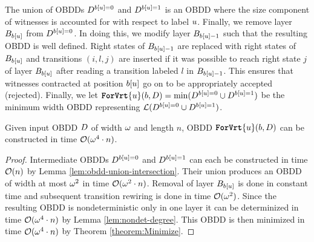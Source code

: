The union of OBDDs $D^{b[u]=0}$ and $D^{b[u]=1}$ is an OBDD where the size component of witnesses is accounted for with respect to label $u$. Finally, we remove layer $B_{b[u]}$ from $D^{b[u]=0}$. In doing this, we modify layer $B_{b[u]-1}$ such that the resulting OBDD is well defined. Right states of $B_{b[u]-1}$ are replaced with right states of $B_{b[u]}$ and transitions $(i,l,j)$ are inserted if it was possible to reach right state $j$ of layer $B_{b[u]}$ after reading a transition labeled $l$ in $B_{b[u]-1}$. This ensures that witnesses contracted at position $b[u]$ go on to be appropriately accepted (rejected). 
Finally, we let $\texttt{\textbf{ForVrt}}\{u\}(b, D) = \mathrm{min}(D^{b[u]=0}\cup D^{b[u]=1})$ be the minimum width OBDD representing $\mathcal{L}(D^{b[u]=0}\cup D^{b[u]=1})$.

\begin{proposition}\label{forgettime}
    Given input OBDD $D$ of width $\omega$ and length $n$, OBDD $\texttt{\textbf{ForVrt}}\{u\}(b, D)$ can be constructed in time $\mathcal{O}(\omega^4 \cdot n)$. 
\end{proposition}
\begin{proof}
    Intermediate OBDDs $D^{b[u]=0}$ and $D^{b[u]=1}$ can each be constructed in time $\mathcal{O}(n)$ by Lemma \ref{lem:obdd-union-intersection}. Their union produces an OBDD of width at most $\omega^2$ in time $\mathcal{O}(\omega^2\cdot n)$. Removal of layer $B_{b[u]}$ is done in constant time and subsequent transition rewiring is done in time $\mathcal{O}(\omega^2)$. Since the resulting OBDD is nondeterministic only in one layer it can be determinized in time $\mathcal{O}(\omega^4 \cdot n)$ by Lemma \ref{lem:nondet-degree}. This OBDD is then minimized in time $\mathcal{O}(\omega^4 \cdot n)$ by Theorem \ref{theorem:Minimize}.  
\end{proof}



